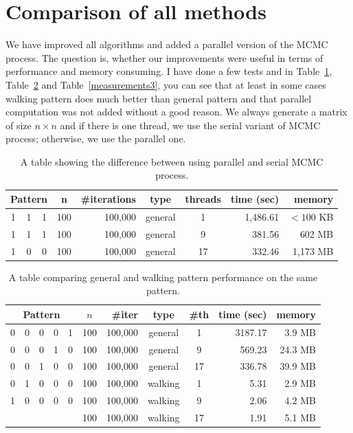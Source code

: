 \section{Comparison of all methods}
We have improved all algorithms and added a parallel version of the MCMC process. The question is, whether our improvements were useful in terms of performance and memory consuming. I have done a few tests and in Table~\ref{measurements1}, Table~\ref{measurements2} and Table~\ref{measurements3}, you can see that at least in some cases walking pattern does much better than general pattern and that parallel computation was not added without a good reason. We always generate a matrix of size $n\times n$ and if there is one thread, we use the serial variant of MCMC process; otherwise, we use the parallel one.
\begin{table}[]
\centering
\begin{tabular}{|ccc|c|r|c|c|r|r|}
\hline
\multicolumn{3}{|c|}{\textbf{Pattern}} & \textbf{n} & \textbf{\#iterations} & \textbf{type} & \textbf{threads} & \textbf{time (sec)} & \textbf{memory} \\ \hline
1 & 1 & 1 & 100 & 100,000 & general & 1 & 1,486.61 & $<100$ KB \\ \cline{4-9} 
1 & 1 & 1 & 100 & 100,000 & general & 9 & 381.56 & 602 MB \\ \cline{4-9} 
1 & 0 & 0 & 100 & 100,000 & general & 17 & 332.46 & 1,173 MB \\ \hline
\end{tabular}
\caption{A table showing the difference between using parallel and serial MCMC process.}
\label{measurements1}
\end{table}

\begin{table}[]
\centering
\begin{tabular}{|ccccc|c|r|c|c|r|r|}
\hline
\multicolumn{5}{|c|}{\textbf{Pattern}} & \textbf{$n$} & \textbf{\#iter} & \textbf{type} & \textbf{\#th} & \textbf{time (sec)} & \textbf{memory} \\ \hline
0 & 0 & 0 & 0 & 1 & 100 & 100,000 & general & 1 & 3187.17 & 3.9 MB \\ \cline{6-11} 
0 & 0 & 0 & 1 & 0 & 100 & 100,000 & general & 9 & 569.23 & 24.3 MB \\ \cline{6-11} 
0 & 0 & 1 & 0 & 0 & 100 & 100,000 & general & 17 & 336.78 & 39.9 MB \\ \cline{6-11} 
0 & 1 & 0 & 0 & 0 & 100 & 100,000 & walking & 1 & 5.31 & 2.9 MB \\ \cline{6-11} 
1 & 0 & 0 & 0 & 0 & 100 & 100,000 & walking & 9 & 2.06 & 4.2 MB \\ \cline{6-11} 
  &   &   &   &   & 100 & 100,000 & walking & 17 & 1.91 & 5.1 MB \\ \hline
\end{tabular}
\caption{A table comparing general and walking pattern performance on the same pattern.}
\label{measurements2}
\end{table}


